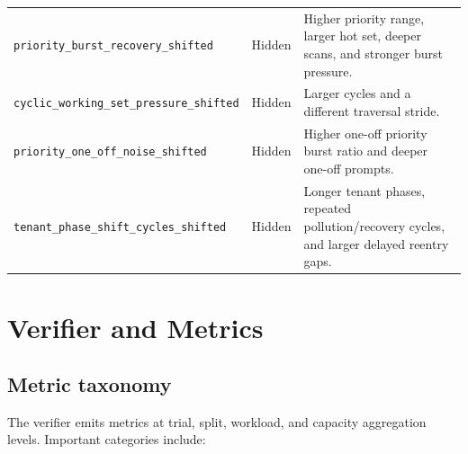 \documentclass[11pt]{article}
\newcommand{\identifier}[1]{\nolinkurl{#1}}
\begin{document}
\begin{longtable}{>{\raggedright\arraybackslash}p{}
                  >{\raggedright\arraybackslash}p{}
                  >{\raggedright\arraybackslash}p{}}
\identifier{priority_burst_recovery_shifted} & Hidden &
Higher priority range, larger hot set, deeper scans, and stronger burst pressure. \\
\identifier{cyclic_working_set_pressure_shifted} & Hidden &
Larger cycles and a different traversal stride. \\
\identifier{priority_one_off_noise_shifted} & Hidden &
Higher one-off priority burst ratio and deeper one-off prompts. \\
\identifier{tenant_phase_shift_cycles_shifted} & Hidden &
Longer tenant phases, repeated pollution/recovery cycles, and larger delayed reentry
gaps. \\
\bottomrule
\end{longtable}

\section{Verifier and Metrics}

\subsection{Metric taxonomy}

The verifier emits metrics at trial, split, workload, and capacity aggregation levels.
Important categories include:
\end{document}
